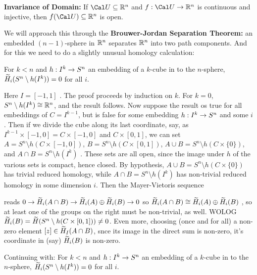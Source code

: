 \msk

{\bf Invariance of Domain:} If ${\Cal U}\subseteq {\Bbb R}^n$ and $f:{\Cal U}\ra {\Bbb R}^n$
is continuous and injective, then $f({\Cal U})\subseteq {\Bbb R}^n$ is open.

\msk

We will approach this through the {\bf Brouwer-Jordan Separation Theorem:} an embedded $(n-1)$-sphere
in ${\Bbb R}^n$ separates ${\Bbb R}^n$ into two path components. And for this we need to do a slightly
unusual homology calculation:

\ssk

For $k<n$ and $h:I^k\rightarrow S^n$ an embedding of a $k$-cube in to the $n$-sphere,
$\widetilde{H}_i(S^n\setminus h(I^k))=0$ for all $i$.

\ssk 

Here $I=[-1,1]$ . The proof proceeds by induction on $k$. For $k=0$, $S^n\setminus h(I^k)\cong {\Bbb R}^n$,
and the result follows. Now suppose the result os true for all embeddings of $C=I^{k-1}$,
but is false for some embedding $h:I^k\rightarrow S^n$ and some $i$. Then if we divide the cube along its last coordinate, say,
as $I^{k-1}\times [-1,0] = C\times [-1,0]$ and $C\times [0,1]$, we can set
$A=S^n\setminus h(C\times [-1,0])$, $B = S^n\setminus h(C\times [0,1])$, 
$A\cup B = S^n\setminus h(C\times \{0\})$, and $A\cap B = S^n\setminus h(I^k)$ .
These sets are all open, since the image under $h$ of the various sets is compact, hence closed.
By hypothesis, $A\cup B = S^n\setminus h(C\times \{0\})$ has trivial reduced homology, while
$A\cap B = S^n\setminus h(I^k)$ has non-trivial reduced homology in some dimension $i$. Then 
the Mayer-Vietoris sequence

\ssk


\ssk  reads $0\rightarrow \widetilde{H}_i(A\cap B) \rightarrow \widetilde{H}_i(A)\oplus \widetilde{H}_i(B) \rightarrow 0$ so 
$\widetilde{H}_i(A\cap B) \cong \widetilde{H}_i(A)\oplus \widetilde{H}_i(B)$ , so at least one of the groups
on the right must be non-trivial, as well. WOLOG $\widetilde{H}_i(B)=\widetilde{H}(S^n\setminus h(C\times [0,1]))\neq 0$.
Even more, choosing (once and for all) a non-zero element $[z]\in \widetilde{H}_I(A\cap B)$, snce its image in the
direct sum is non-zero, it's coordinate in (say) $\widetilde{H}_i(B)$ is non-zero.

\bsk

Continuing with: \hhsk
For $k<n$ and $h:I^k\rightarrow S^n$ an embedding of a $k$-cube in to the $n$-sphere,
$\widetilde{H}_i(S^n\setminus h(I^k))=0$ for all $i$.

